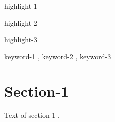 \documentclass[a4paper,fleqn]{cas-sc}
\begin{document}

\begin{highlights}
\item highlight-1
\item highlight-2
\item highlight-3
\end{highlights}

\begin{keywords}
keyword-1 \sep 
keyword-2 \sep 
keyword-3
\end{keywords}

\maketitle

\section{Section-1}

Text of section-1 \cite{Fortunato2010}.




\end{document}
